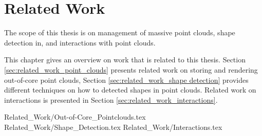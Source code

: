 \chapter {Related Work}
\label{chap:related_work}

The scope of this thesis is on management of massive point clouds, shape detection in, and interactions with point clouds. 

This chapter gives an overview on work that is related to this thesis. Section \ref{sec:related_work_point_clouds} presents related work on storing and rendering out-of-core point clouds, Section \ref{sec:related_work_shape detection} provides different techniques on how to detected shapes in point clouds. Related work on interactions is presented in Section \ref{sec:related_work_interactions}. 

 {Related_Work/Out-of-Core_Pointclouds.tex}
 {Related_Work/Shape_Detection.tex}
 {Related_Work/Interactions.tex}